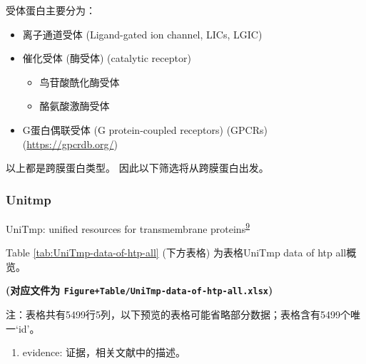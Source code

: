 \documentclass[
]{article}
\providecommand{\tightlist}{%
  \setlength{\itemsep}{0pt}\setlength{\parskip}{0pt}}
\begin{document}
受体蛋白主要分为：

\begin{itemize}
\tightlist
\item
  离子通道受体 (Ligand-gated ion channel, LICs, LGIC)
\item
  催化受体 (酶受体) (catalytic receptor)

  \begin{itemize}
  \tightlist
  \item
    鸟苷酸酰化酶受体
  \item
    酪氨酸激酶受体
  \end{itemize}
\item
  G蛋白偶联受体 (G protein-coupled receptors) (GPCRs) (\url{https://gpcrdb.org/})
\end{itemize}

以上都是跨膜蛋白类型。
因此以下筛选将从跨膜蛋白出发。

\hypertarget{unitmp}{%
\subsubsection{Unitmp}\label{unitmp}}

UniTmp: unified resources for transmembrane proteins\textsuperscript{\protect\hyperlink{ref-UnitmpUnifiedDobson2024}{9}}

Table \ref{tab:UniTmp-data-of-htp-all} (下方表格) 为表格UniTmp data of htp all概览。

\textbf{(对应文件为 \texttt{Figure+Table/UniTmp-data-of-htp-all.xlsx})}

\begin{center}\begin{tcolorbox}[colback=gray!10, colframe=gray!50, width=0.9\linewidth, arc=1mm, boxrule=0.5pt]注：表格共有5499行5列，以下预览的表格可能省略部分数据；表格含有5499个唯一`id'。
\end{tcolorbox}
\end{center}
\begin{center}\begin{tcolorbox}[colback=gray!10, colframe=gray!50, width=0.9\linewidth, arc=1mm, boxrule=0.5pt]\begin{enumerate}\tightlist
\item evidence:  证据，相关文献中的描述。
\end{enumerate}\end{tcolorbox}
\end{center}
\end{document}
